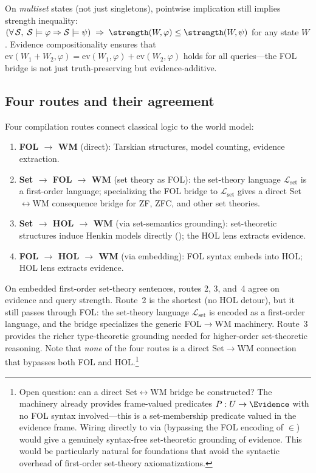\documentclass[11pt,openany]{report}
\begin{document}
\noindent
On \emph{multiset} states (not just singletons), pointwise
implication still implies strength inequality:
$(\forall\, \mathcal{S},\; \mathcal{S} \models \varphi \Rightarrow
\mathcal{S} \models \psi)
\;\Rightarrow\; \strength(W, \varphi) \le \strength(W, \psi)$
for any state $W$.  Evidence compositionality ensures that
$\mathrm{ev}(W_1 + W_2, \varphi) = \mathrm{ev}(W_1, \varphi) +
\mathrm{ev}(W_2, \varphi)$ holds for all queries---the FOL bridge
is not just truth-preserving but evidence-additive.

\subsection{Four routes and their agreement}

Four compilation routes connect classical logic to the world model:
\begin{enumerate}
\item \textbf{FOL $\to$ WM} (direct): Tarskian structures, model
  counting, evidence extraction.
\item \textbf{Set $\to$ FOL $\to$ WM} (set theory as FOL): the
  set-theory language $\mathcal{L}_{\mathrm{set}}$ is a first-order
  language; specializing the FOL bridge to $\mathcal{L}_{\mathrm{set}}$
  gives a direct Set$\leftrightarrow$WM consequence bridge for ZF,
  ZFC, and other set theories.
\item \textbf{Set $\to$ HOL $\to$ WM} (via set-semantics grounding):
  set-theoretic structures induce Henkin models directly
  (); the HOL lens extracts evidence.
\item \textbf{FOL $\to$ HOL $\to$ WM} (via embedding): FOL syntax
  embeds into HOL; HOL lens extracts evidence.
\end{enumerate}

\noindent
On embedded first-order set-theory sentences, routes 2, 3, and~4 agree
on evidence and query strength.  Route~2 is the shortest (no HOL
detour), but it still passes through FOL: the set-theory language
$\mathcal{L}_{\mathrm{set}}$ is encoded as a first-order language,
and the bridge specializes the generic FOL$\to$WM machinery.
Route~3 provides the richer type-theoretic grounding needed for
higher-order set-theoretic reasoning.  Note that \emph{none} of the
four routes is a direct Set$\to$WM connection that bypasses both FOL
and HOL.\footnote{Open question: can a direct Set$\leftrightarrow$WM
bridge be constructed?  The  machinery already
provides frame-valued predicates $P : U \to \Evidence$ with no FOL
syntax involved---this is a set-membership predicate valued in
the evidence frame.  Wiring  directly to
 via  (bypassing the FOL
encoding of $\in$) would give a genuinely syntax-free
set-theoretic grounding of evidence.  This would be particularly
natural for foundations that avoid the syntactic overhead of
first-order set-theory axiomatizations.}
\end{document}
